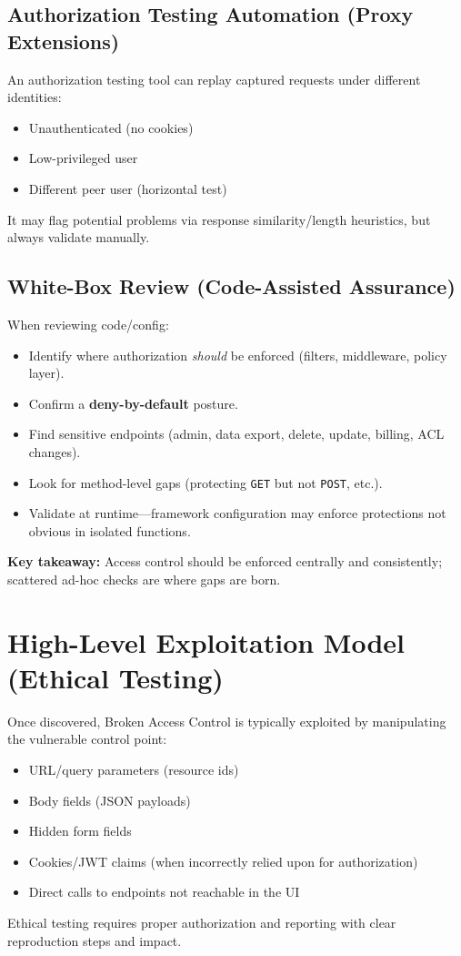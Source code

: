 \documentclass[11pt]{article}
\newcommand{\KeyTakeaway}[1]{%
  \vspace{0.5em}
  \noindent\textbf{Key takeaway:} #1
  \vspace{0.5em}
}
\begin{document}
\subsection{Authorization Testing Automation (Proxy Extensions)}
An authorization testing tool can replay captured requests under different identities:
\begin{itemize}
  \item Unauthenticated (no cookies)
  \item Low-privileged user
  \item Different peer user (horizontal test)
\end{itemize}
It may flag potential problems via response similarity/length heuristics, but always validate manually.

\subsection{White-Box Review (Code-Assisted Assurance)}
When reviewing code/config:
\begin{itemize}
  \item Identify where authorization \emph{should} be enforced (filters, middleware, policy layer).
  \item Confirm a \textbf{deny-by-default} posture.
  \item Find sensitive endpoints (admin, data export, delete, update, billing, ACL changes).
  \item Look for method-level gaps (protecting \texttt{GET} but not \texttt{POST}, etc.).
  \item Validate at runtime---framework configuration may enforce protections not obvious in isolated functions.
\end{itemize}

\KeyTakeaway{Access control should be enforced centrally and consistently; scattered ad-hoc checks are where gaps are born.}

\section{High-Level Exploitation Model (Ethical Testing)}
Once discovered, Broken Access Control is typically exploited by manipulating the vulnerable control point:
\begin{itemize}
  \item URL/query parameters (resource ids)
  \item Body fields (JSON payloads)
  \item Hidden form fields
  \item Cookies/JWT claims (when incorrectly relied upon for authorization)
  \item Direct calls to endpoints not reachable in the UI
\end{itemize}
Ethical testing requires proper authorization and reporting with clear reproduction steps and impact.
\end{document}
